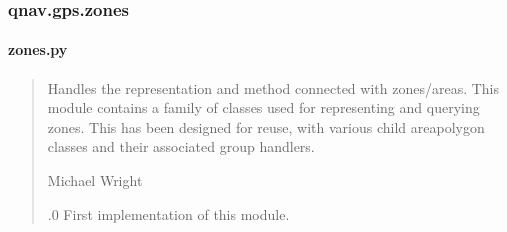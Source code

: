 \documentclass[letterpaper,10pt,english]{sphinxmanual}
\begin{document}
\begin{fulllineitems}
\begin{fulllineitems}
\begin{quote}
\begin{description}
\end{description}\end{quote}

\end{fulllineitems}


\end{fulllineitems}


\sphinxstepscope


\subsubsection{qnav.gps.zones}
\label{\detokenize{modules/gps/zones:module-qnav.gps.zones}}\label{\detokenize{modules/gps/zones:qnav-gps-zones}}\label{\detokenize{modules/gps/zones::doc}}

\paragraph{zones.py}
\label{\detokenize{modules/gps/zones:zones-py}}\begin{quote}\begin{description}
\sphinxAtStartPar
Handles the representation and method connected with zones/areas.
This module contains a family of classes used for representing
and querying zones. This has been designed for reuse, with various
child area\sphinxhyphen{}polygon classes and their associated group handlers.

\sphinxAtStartPar
Michael Wright \sphinxhyphen{} 

.0 \sphinxhyphen{} First implementation of this module.

\end{description}\end{quote}
\end{document}
